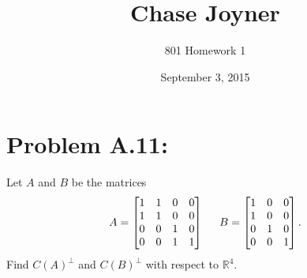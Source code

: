 \documentclass[11pt]{article}
\title{Chase Joyner}
\author{801 Homework 1}
\date{September 3, 2015}
\newcommand{\R}{{\mathbb R}}
\begin{document}
\maketitle
\section*{Problem A.11:}  Let $A$ and $B$ be the matrices
\[ A=
\begin{bmatrix}
1 & 1 & 0 & 0 \\
1 & 1 & 0 & 0 \\
0 & 0 & 1 & 0 \\
0 & 0 & 1 & 1
\end{bmatrix}
\hspace{5mm}
B=
\begin{bmatrix}
1 & 0 & 0 \\
1 & 0 & 0 \\
0 & 1 & 0 \\
0 & 0 & 1
\end{bmatrix}.
\]
Find $C(A)^\perp$ and $C(B)^\perp$ with respect to $\R^4$.
\end{document}
